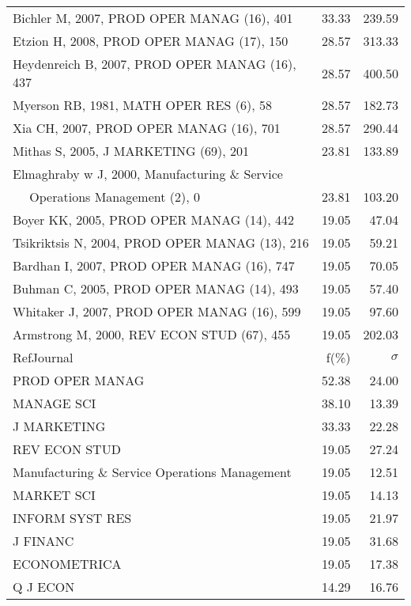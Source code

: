 \documentclass[a4paper,11pt]{report}
\begin{document}
\begin{landscape}
\begin{table}[!ht]
{\begin{tabular}{|l r r|}
Bichler M, 2007, PROD OPER MANAG (16), 401 & 33.33 & 239.59\\
Etzion H, 2008, PROD OPER MANAG (17), 150 & 28.57 & 313.33\\
Heydenreich B, 2007, PROD OPER MANAG (16), 437 & 28.57 & 400.50\\
Myerson RB, 1981, MATH OPER RES (6), 58 & 28.57 & 182.73\\
Xia CH, 2007, PROD OPER MANAG (16), 701 & 28.57 & 290.44\\
Mithas S, 2005, J MARKETING (69), 201 & 23.81 & 133.89\\
Elmaghraby w J, 2000, Manufacturing \& Service &  & \\
$\quad$ Operations Management (2), 0 & 23.81 & 103.20\\
Boyer KK, 2005, PROD OPER MANAG (14), 442 & 19.05 & 47.04\\
Tsikriktsis N, 2004, PROD OPER MANAG (13), 216 & 19.05 & 59.21\\
Bardhan I, 2007, PROD OPER MANAG (16), 747 & 19.05 & 70.05\\
Buhman C, 2005, PROD OPER MANAG (14), 493 & 19.05 & 57.40\\
Whitaker J, 2007, PROD OPER MANAG (16), 599 & 19.05 & 97.60\\
Armstrong M, 2000, REV ECON STUD (67), 455 & 19.05 & 202.03\\
\hline
\hline
RefJournal & f(\%) & $\sigma$\\
\hline
PROD OPER MANAG & 52.38 & 24.00\\
MANAGE SCI & 38.10 & 13.39\\
J MARKETING & 33.33 & 22.28\\
REV ECON STUD & 19.05 & 27.24\\
Manufacturing \& Service Operations Management & 19.05 & 12.51\\
MARKET SCI & 19.05 & 14.13\\
INFORM SYST RES & 19.05 & 21.97\\
J FINANC & 19.05 & 31.68\\
ECONOMETRICA & 19.05 & 17.38\\
Q J ECON & 14.29 & 16.76\\
\hline
\end{tabular}
}
\end{table}

\end{landscape}
\end{document}
